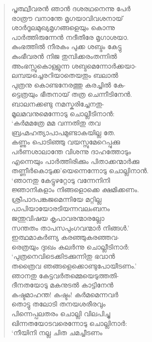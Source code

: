 \begin{verse}
പൃത്ഥ്വീവരന്‍ ഞാന്‍ ദശരഥനെന്നു പേര്‍\\
രാത്രൗ വനാന്തേ മൃഗയാവിവശനായ്\\
ശാര്‍ദൂലമുഖ്യമൃഗങ്ങളെയും കൊന്നു\\
പാര്‍ത്തിരുന്നേന്‍ നദീതീരേ മൃഗാശയാ.\\
കുംഭത്തില്‍ നീരകം പുക്ക ശബ്ദം കേട്ടു\\
കുംഭീവരന്‍ നിജ തുമ്പിക്കരംതന്നില്‍\\
അംഭസ്സുകൊള്ളുന്ന ശബ്ദമെന്നോര്‍ക്കയാ-\\
ലമ്പയച്ചെരറിയാതെയതും ബലാല്‍\\
പുത്രനു കൊണ്ടനേരത്തു കരച്ചില്‍ കേ-\\
ട്ടെത്രയും ഭീതനായ് തത്ര ചെന്നീടിനേന്‍.\\
ബാലനക്കണ്ടു നമസ്കരിച്ചേനതു-\\
മൂലമവനുമെന്നോടു ചൊല്ലീടിനാന്‍:\\
‘കര്‍മമത്രേ മമ വന്നതിതു തവ\\
ബ്രഹ്മഹത്യാപാപമുണ്ടാകയില്ല തേ.\\
കണ്ണും പൊടിഞ്ഞു വയസ്സുമേറെപ്പുക്കു\\
പര്‍ണശാലാന്തേ വിശന്നു ദാഹത്തോടും\\
എന്നെയും പാര്‍ത്തിരിക്കും പിതാക്കന്മാര്‍ക്കു\\
തണ്ണീര്‍കൊടുക്ക’യെന്നെന്നോടു ചൊല്ലിനാന്‍.\\
‘ഞാനതു കേട്ടുഴറ്റോടു വന്നേനിനി\\
ജ്ഞാനികളാം നിങ്ങളൊക്കെ ക്ഷമിക്കണം.\\
ശ്രീപാദപങ്കജമെന്നിയേ മറ്റില്ല\\
പാപിയായോരടിയന്നവലംബനം\\
ജന്തുവിഷയ കൃപാവരന്മാരല്ലോ\\
സന്തതം താപസപുംഗവന്മാര്‍ നിങ്ങള്‍.’\\
ഇത്ഥമാകര്‍ണ്യ കരഞ്ഞുകരഞ്ഞവ-\\
രെത്രയും ദുഃഖം കലര്‍ന്നു ചൊല്ലീടിനാര്‍:\\
‘പുത്രനെവിടെക്കിടക്കുന്നിതു ഭവാന്‍\\
തത്രൈവ ഞങ്ങളെക്കൊണ്ടുപോയീടണം.’\\
ഞാനതു കേട്ടവര്‍തമ്മെയെടുത്തതി-\\
ദീനതയോടു മകനുടല്‍ കാട്ടിനേന്‍\\
കഷ്ടമാഹന്ത! കഷ്ടം! കര്‍മമെന്നവര്‍\\
തൊട്ടു തലോടി തനയശരീരവും\\
പിന്നെപ്പലതരം ചൊല്ലി വിലപിച്ചു\\
ഖിന്നതയോടവരെന്നോടു ചൊല്ലിനാര്‍:\\
‘നീയിനി നല്ല ചിത ചമച്ചീടണം\\

\end{verse}
